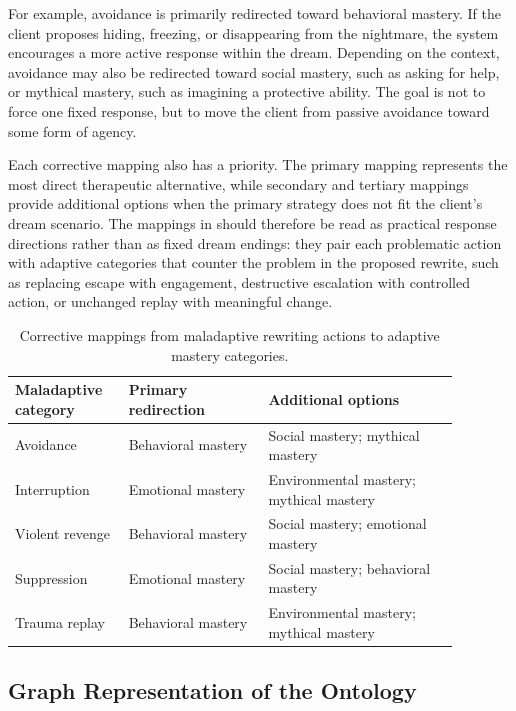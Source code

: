 For example, avoidance is primarily redirected toward behavioral mastery. If the client proposes hiding, freezing, or disappearing from the nightmare, the system encourages a more active response within the dream. Depending on the context, avoidance may also be redirected toward social mastery, such as asking for help, or mythical mastery, such as imagining a protective ability. The goal is not to force one fixed response, but to move the client from passive avoidance toward some form of agency.

Each corrective mapping also has a priority. The primary mapping represents the most direct therapeutic alternative, while secondary and tertiary mappings provide additional options when the primary strategy does not fit the client's dream scenario. The mappings in  should therefore be read as practical response directions rather than as fixed dream endings: they pair each problematic action with adaptive categories that counter the problem in the proposed rewrite, such as replacing escape with engagement, destructive escalation with controlled action, or unchanged replay with meaningful change.

\begin{table}
  \centering
  \caption{Corrective mappings from maladaptive rewriting actions to adaptive mastery categories.}
  \label{tab:corrective-mappings}
  \renewcommand{\arraystretch}{1.25}
  \begin{tabular}{p{0.22\linewidth}p{0.28\linewidth}p{0.38\linewidth}}
    \toprule
    Maladaptive category & Primary redirection & Additional options \\
    \midrule
    Avoidance & Behavioral mastery & Social mastery; mythical mastery \\
    Interruption & Emotional mastery & Environmental mastery; mythical mastery \\
    Violent revenge & Behavioral mastery & Social mastery; emotional mastery \\
    Suppression & Emotional mastery & Social mastery; behavioral mastery \\
    Trauma replay & Behavioral mastery & Environmental mastery; mythical mastery \\
    \bottomrule
  \end{tabular}
\end{table}

\subsection{Graph Representation of the Ontology}

